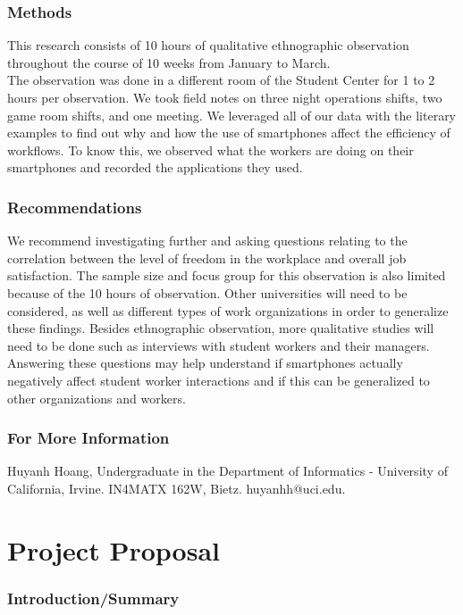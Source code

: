 \documentclass[letterpaper, 12pt]{report}
\begin{document}
\section{Methods}
This research consists of 10 hours of qualitative ethnographic observation throughout the course of 10 weeks from January to March.\\

The observation was done in a different room of the Student Center for 1 to 2 hours per observation. We took field notes on three night operations shifts, two game room shifts, and one meeting. We leveraged all of our data with the literary examples to find out why and how the use of smartphones affect the efficiency of workflows. To know this, we observed what the workers are doing on their smartphones and recorded the applications they used.


\section{Recommendations}
We recommend investigating further and asking questions relating to the correlation between the level of freedom in the workplace and overall job satisfaction. The sample size and focus group for this observation is also limited because of the 10 hours of observation. Other universities will need to be considered, as well as different types of work organizations in order to generalize these findings. Besides ethnographic observation, more qualitative studies will need to be done such as interviews with student workers and their managers. Answering these questions may help understand if smartphones actually negatively affect student worker interactions and if this can be generalized to other organizations and workers.

\section*{For More Information}
Huyanh Hoang, Undergraduate in the Department of Informatics - University of California, Irvine. IN4MATX 162W, Bietz. huyanhh@uci.edu.


\part{Project Proposal}
\section{Introduction/Summary}
\end{document}
